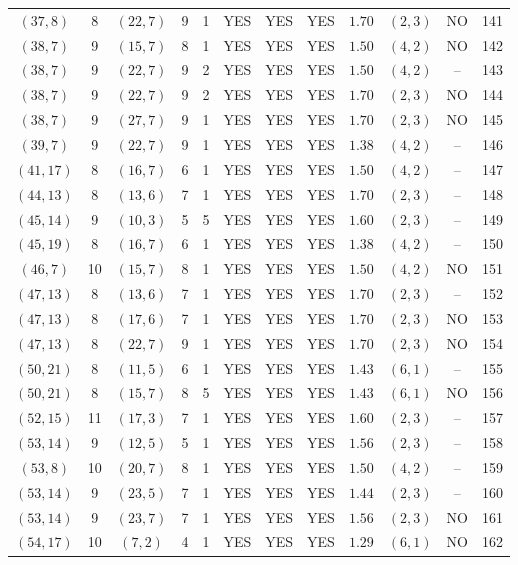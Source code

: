 \begin{longtable}{|c|c|c|c|c|c|c|c|c|c|c|c|}
$(37,8)$ & 8 & $(22,7)$ & 9 & 1 & YES & YES & YES & $1.70$ & $(2,3)$ & NO & 141\\
$(38,7)$ & 9 & $(15,7)$ & 8 & 1 & YES & YES & YES & $1.50$ & $(4,2)$ & NO & 142\\
$(38,7)$ & 9 & $(22,7)$ & 9 & 2 & YES & YES & YES & $1.50$ & $(4,2)$ & -- & 143\\
$(38,7)$ & 9 & $(22,7)$ & 9 & 2 & YES & YES & YES & $1.70$ & $(2,3)$ & NO & 144\\
$(38,7)$ & 9 & $(27,7)$ & 9 & 1 & YES & YES & YES & $1.70$ & $(2,3)$ & NO & 145\\
$(39,7)$ & 9 & $(22,7)$ & 9 & 1 & YES & YES & YES & $1.38$ & $(4,2)$ & -- & 146\\
$(41,17)$ & 8 & $(16,7)$ & 6 & 1 & YES & YES & YES & $1.50$ & $(4,2)$ & -- & 147\\
$(44,13)$ & 8 & $(13,6)$ & 7 & 1 & YES & YES & YES & $1.70$ & $(2,3)$ & -- & 148\\
$(45,14)$ & 9 & $(10,3)$ & 5 & 5 & YES & YES & YES & $1.60$ & $(2,3)$ & -- & 149\\
$(45,19)$ & 8 & $(16,7)$ & 6 & 1 & YES & YES & YES & $1.38$ & $(4,2)$ & -- & 150\\
$(46,7)$ & 10 & $(15,7)$ & 8 & 1 & YES & YES & YES & $1.50$ & $(4,2)$ & NO & 151\\
$(47,13)$ & 8 & $(13,6)$ & 7 & 1 & YES & YES & YES & $1.70$ & $(2,3)$ & -- & 152\\
$(47,13)$ & 8 & $(17,6)$ & 7 & 1 & YES & YES & YES & $1.70$ & $(2,3)$ & NO & 153\\
$(47,13)$ & 8 & $(22,7)$ & 9 & 1 & YES & YES & YES & $1.70$ & $(2,3)$ & NO & 154\\
$(50,21)$ & 8 & $(11,5)$ & 6 & 1 & YES & YES & YES & $1.43$ & $(6,1)$ & -- & 155\\
$(50,21)$ & 8 & $(15,7)$ & 8 & 5 & YES & YES & YES & $1.43$ & $(6,1)$ & NO & 156\\
$(52,15)$ & 11 & $(17,3)$ & 7 & 1 & YES & YES & YES & $1.60$ & $(2,3)$ & -- & 157\\
$(53,14)$ & 9 & $(12,5)$ & 5 & 1 & YES & YES & YES & $1.56$ & $(2,3)$ & -- & 158\\
$(53,8)$ & 10 & $(20,7)$ & 8 & 1 & YES & YES & YES & $1.50$ & $(4,2)$ & -- & 159\\
$(53,14)$ & 9 & $(23,5)$ & 7 & 1 & YES & YES & YES & $1.44$ & $(2,3)$ & -- & 160\\
$(53,14)$ & 9 & $(23,7)$ & 7 & 1 & YES & YES & YES & $1.56$ & $(2,3)$ & NO & 161\\
$(54,17)$ & 10 & $(7,2)$ & 4 & 1 & YES & YES & YES & $1.29$ & $(6,1)$ & NO & 162\\

\end{longtable}
